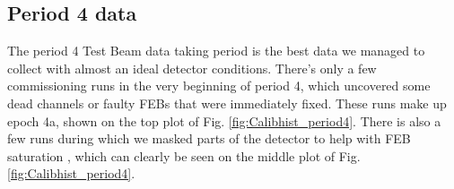 \FloatBarrier
\subsection{Period 4 data}\label{sec:TBPeriod4}

The period 4 Test Beam data taking period is the best data we managed to collect with almost an ideal detector conditions. There's only a few commissioning runs in the very beginning of period 4, which uncovered some dead channels or faulty FEBs that were immediately fixed. These runs make up epoch 4a, shown on the top plot of Fig. \ref{fig:Calibhist_period4}. There is also a few runs during which we masked parts of the detector to help with FEB saturation \cite{NOVA-doc-53658}, which can clearly be seen on the middle plot of Fig. \ref{fig:Calibhist_period4}.

